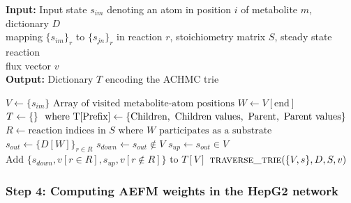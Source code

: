 \documentclass[12pt]{article}
\begin{document}
\begin{algorithm}
\caption{Depth-first construction of the ACHMC trie}\label{alg01:trie}
\hspace*{\algorithmicindent} \textbf{Input:} Input state $s_{im}$
denoting an atom in position $i$ of metabolite $m$, dictionary $D$ \\
\hspace*{\algorithmicindent} mapping $\{s_{im}\}_r$ to $\{s_{jn}\}_r$ in reaction $r$, stoichiometry matrix $S$, steady state reaction\\
\hspace*{\algorithmicindent} flux vector $v$\\
\hspace*{\algorithmicindent} \textbf{Output:} Dictionary $T$ encoding the ACHMC trie
\begin{algorithmic}[1]
    \State $V \gets \{s_{im}\} \text{ Array of visited metabolite-atom positions}$
    \State $W \gets V[\text{end}] \text{}$
    \State $T \gets \{\}\ \text{ where T[\text{Prefix}]} \gets \{\text{Children}, \text{ Children values}, \text{ Parent}, \text{ Parent values}\}$
    \State $R \gets \text{reaction indices in } S \text{ where } W \text{ participates as a substrate}$
    \State $s_{out} \gets \{D[W]\}_{r \in R}$
    \State $s_{down} \gets s_{out} \notin V$ 
    \State $s_{up} \gets s_{out} \in V$
    \State $\text{Add } \{s_{down}, v[r\in R], s_{up}, v[r\notin R]\} \text{ to } T[V]$
        \State $\textsc{traverse\_trie}(\{V, s\}, D, S, v)$
    \EndFor
\EndFunction
\end{algorithmic}
\end{algorithm}

\subsubsection*{Step 4: Computing AEFM weights in the HepG2 network}
\end{document}
